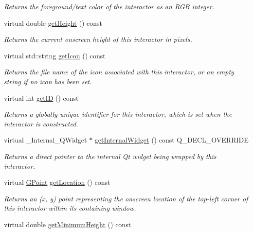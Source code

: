 \begin{DoxyCompactItemize}
\begin{DoxyCompactList}\small\item\em Returns the foreground/text color of the interactor as an R\+GB integer. \end{DoxyCompactList}\item 
virtual double \mbox{\hyperlink{classGInteractor_a1e7e353362434072875264cf95629f99}{get\+Height}} () const
\begin{DoxyCompactList}\small\item\em Returns the current onscreen height of this interactor in pixels. \end{DoxyCompactList}\item 
virtual std\+::string \mbox{\hyperlink{classGInteractor_aaed62a73004939a64da6f0eb9eb64d73}{get\+Icon}} () const
\begin{DoxyCompactList}\small\item\em Returns the file name of the icon associated with this interactor, or an empty string if no icon has been set. \end{DoxyCompactList}\item 
virtual int \mbox{\hyperlink{classGInteractor_a9c9659a6c6ba66b4107ba59c95a24241}{get\+ID}} () const
\begin{DoxyCompactList}\small\item\em Returns a globally unique identifier for this interactor, which is set when the interactor is constructed. \end{DoxyCompactList}\item 
virtual \+\_\+\+Internal\+\_\+\+Q\+Widget $\ast$ \mbox{\hyperlink{classGBrowserPane_a208ce13c1da40bf0ddb509daf99d6588}{get\+Internal\+Widget}} () const Q\+\_\+\+D\+E\+C\+L\+\_\+\+O\+V\+E\+R\+R\+I\+DE
\begin{DoxyCompactList}\small\item\em Returns a direct pointer to the internal Qt widget being wrapped by this interactor. \end{DoxyCompactList}\item 
virtual \mbox{\hyperlink{classGPoint}{G\+Point}} \mbox{\hyperlink{classGInteractor_a4f83802015511edeb63b892830812c11}{get\+Location}} () const
\begin{DoxyCompactList}\small\item\em Returns an (x, y) point representing the onscreen location of the top-\/left corner of this interactor within its containing window. \end{DoxyCompactList}\item 
virtual double \mbox{\hyperlink{classGInteractor_aed4b0075fcc434499c3cb3e46896bda3}{get\+Minimum\+Height}} () const

\end{DoxyCompactItemize}
